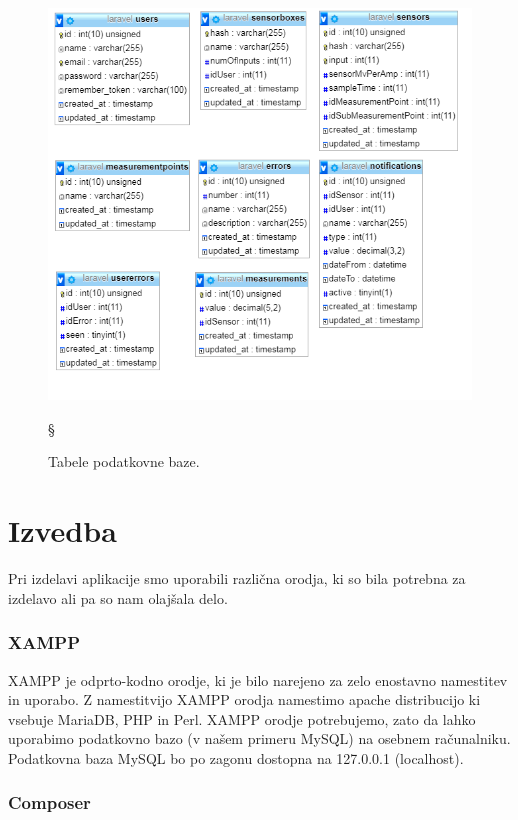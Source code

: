 \documentclass[12pt,a4paper,titlepage,openany]{report}
\begin{document}
\begin{figure}[H]
\begin{center}
\includegraphics[width=1\linewidth]{Slike/DbTabele.png}
\end{center}§
\caption{Tabele podatkovne baze.}\label{slika:DbTabele}
\end{figure}

\chapter{Izvedba}
\thispagestyle{fancy}
Pri izdelavi aplikacije smo uporabili različna orodja, ki so bila potrebna za izdelavo ali pa so nam olajšala delo.

\subsection{XAMPP}
XAMPP je odprto-kodno orodje, ki je bilo narejeno za zelo enostavno namestitev in uporabo. Z namestitvijo XAMPP orodja namestimo apache distribucijo ki vsebuje MariaDB, PHP in Perl.
XAMPP orodje potrebujemo, zato da lahko uporabimo podatkovno bazo (v našem primeru MySQL) na osebnem računalniku. Podatkovna baza MySQL bo po zagonu dostopna na 127.0.0.1 (localhost).

\subsection{Composer}
\end{document}
